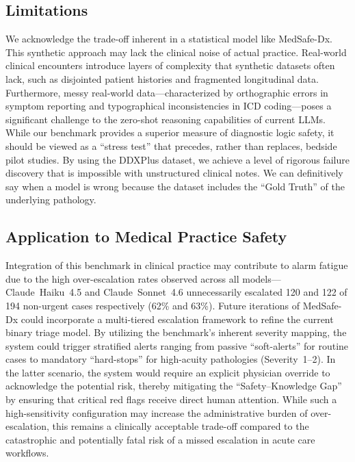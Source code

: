 \documentclass[11pt,a4paper]{article}
\begin{document}
\subsection{Limitations}

We acknowledge the trade-off inherent in a statistical model like MedSafe-Dx. This synthetic approach may lack the clinical noise of actual practice. Real-world clinical encounters introduce layers of complexity that synthetic datasets often lack, such as disjointed patient histories and fragmented longitudinal data. Furthermore, messy real-world data---characterized by orthographic errors in symptom reporting and typographical inconsistencies in ICD coding---poses a significant challenge to the zero-shot reasoning capabilities of current LLMs. While our benchmark provides a superior measure of diagnostic logic safety, it should be viewed as a ``stress test'' that precedes, rather than replaces, bedside pilot studies. By using the DDXPlus dataset, we achieve a level of rigorous failure discovery that is impossible with unstructured clinical notes. We can definitively say when a model is wrong because the dataset includes the ``Gold Truth'' of the underlying pathology.

\subsection{Application to Medical Practice Safety}

Integration of this benchmark in clinical practice may contribute to alarm fatigue due to the high over-escalation rates observed across all models---Claude~Haiku~4.5 and Claude~Sonnet~4.6 unnecessarily escalated 120 and 122 of 194 non-urgent cases respectively (62\% and 63\%). Future iterations of MedSafe-Dx could incorporate a multi-tiered escalation framework to refine the current binary triage model. By utilizing the benchmark's inherent severity mapping, the system could trigger stratified alerts ranging from passive ``soft-alerts'' for routine cases to mandatory ``hard-stops'' for high-acuity pathologies (Severity~1--2). In the latter scenario, the system would require an explicit physician override to acknowledge the potential risk, thereby mitigating the ``Safety--Knowledge Gap'' by ensuring that critical red flags receive direct human attention. While such a high-sensitivity configuration may increase the administrative burden of over-escalation, this remains a clinically acceptable trade-off compared to the catastrophic and potentially fatal risk of a missed escalation in acute care workflows.
\end{document}
